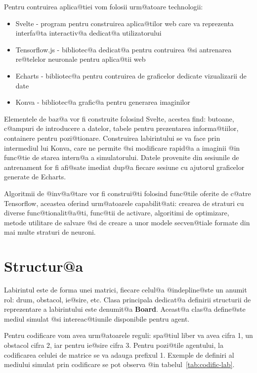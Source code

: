 Pentru contruirea aplica@tiei vom folosii urm@atoare technologii:

\begin{itemize}
	\item Svelte - program pentru construirea aplica@tilor web care va reprezenta interfa@ta interactiv@a dedicat@a utilizatorului \cite{Svelte}
	\item Tensorflow.js - bibliotec@a dedicat@a pentru contruirea @si antrenarea re@telelor neuronale pentru aplica@tii web \cite{TensorflowJs}
	\item Echarts - bibliotec@a pentru contruirea de graficelor dedicate vizualizarii de date \cite{Echarts}
	\item Konva - bibliotec@a grafic@a pentru generarea imaginilor \cite{Konva}
\end{itemize} 

Elementele de baz@a vor fi construite folosind Svelte, acestea find: butoane, c@ampuri de introducere a datelor, tabele pentru prezentarea informa@tiilor, containere pentru pozi@tionare. Construirea labirintului se va face prin intermediul lui Konva, care ne permite @si modificare rapid@a a imaginii @in func@tie de starea intern@a a simulatorului. Datele provenite din sesiunile de antrenament for fi afi@sate imediat dup@a fiecare sesiune cu ajutorul graficelor generate de Echarts.

Algoritmii de @inv@a@tare vor fi construi@ti folosind func@tile oferite de c@atre Tensorflow, aceastea oferind urm@atoarele capabilit@ati: crearea de straturi cu diverse func@tionalit@a@ti, func@tii de activare, algoritimi de optimizare, metode utilitare de salvare @si de creare a unor modele secven@tiale formate din mai multe straturi de neuroni.

\section{Structur@a}





Labirintul este de forma unei matrici, fiecare celul@a @indepline@ste un anumit rol: drum, obstacol, ie@sire, etc. Clasa principala dedicat@a definirii structurii de reprezentare a la\-bi\-rin\-tului este denumit@a \textbf{Board}. Aceast@a clas@a define@ste mediul simulat @si intereac@tiunile disponibile pentru agent.

Pentru codificare vom avea urm@atoarele reguli: spa@tiul liber va avea cifra 1, un obstacol cifra 2, iar pentru ie@sire cifra 3. Pentru pozi@tile agentului, la codificarea celulei de matrice se va adauga prefixul 1. Exemple de definiri al mediului simulat prin codificare se pot observa @in tabelul~\ref{tab:codific-lab}.


